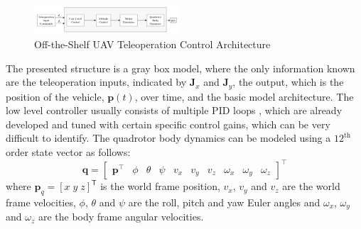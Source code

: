 \documentclass[letterpaper, 10 pt, conference]{ieeeconf}  %
\newcommand\NB[1]{$\spadesuit$\footnote{NB: #1}}
\begin{document}
\begin{figure}[ht]
    \includegraphics[width=0.48\textwidth]{images/teleopctrl.png}
    \caption{Off-the-Shelf UAV Teleoperation Control Architecture}
    \label{fig:otsctrl}
\end{figure}

The presented structure is a gray box model, where the only information known are the teleoperation inputs, indicated by $\mathbf{J}_x$ and $\mathbf{J}_y$, the output, which is the position of the vehicle, $\mathbf{p}(t)$, over time, and the basic model architecture. The low level controller usually consists of multiple PID loops \cite{esen}, which are already developed and tuned with certain specific control gains, which can be very difficult to identify. The quadrotor body dynamics can be modeled using a $12^{\text{th}}$ order state vector as follows:
\begin{equation}
    \mathbf{q} = 
    \begin{bmatrix}
    \mathbf{p}^\intercal & \phi & \theta & \psi & v_x & v_y & v_z & \omega_x & \omega_y & \omega_z
    \end{bmatrix}^\intercal \nonumber
\end{equation} 
where $\bm{p}_q=[x \; y \; z]^{\mathsf{T}}$ is the world frame position, $v_{x}$, $v_{y}$ and $v_z$ are the world frame velocities, $\phi$, $\theta$ and $\psi$ are the roll, pitch and yaw Euler angles and $\omega_{x}$, $\omega_{y}$ and $\omega_{z}$ are the body frame angular velocities.
\end{document}
